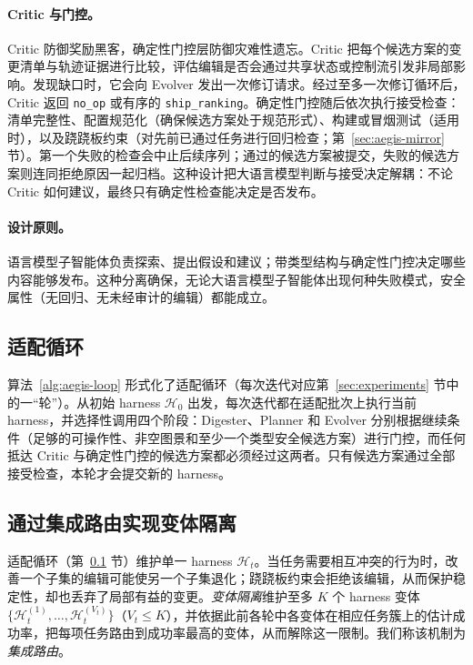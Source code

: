 \paragraph{Critic 与门控。}
Critic 防御奖励黑客，确定性门控层防御灾难性遗忘。Critic 把每个候选方案的变更清单与轨迹证据进行比较，评估编辑是否会通过共享状态或控制流引发非局部影响。发现缺口时，它会向 Evolver 发出一次修订请求。经过至多一次修订循环后，Critic 返回 \texttt{no\_op} 或有序的 \texttt{ship\_ranking}。确定性门控随后依次执行接受检查：清单完整性、配置规范化（确保候选方案处于规范形式）、构建或冒烟测试（适用时），以及跷跷板约束（对先前已通过任务进行回归检查；第~\ref{sec:aegis-mirror} 节）。第一个失败的检查会中止后续序列；通过的候选方案被提交，失败的候选方案则连同拒绝原因一起归档。这种设计把大语言模型判断与接受决定解耦：不论 Critic 如何建议，最终只有确定性检查能决定是否发布。

\paragraph{设计原则。}
语言模型子智能体负责探索、提出假设和建议；带类型结构与确定性门控决定哪些内容能够发布。这种分离确保，无论大语言模型子智能体出现何种失败模式，安全属性（无回归、无未经审计的编辑）都能成立。

\subsection{适配循环}
\label{sec:aegis-loop}

算法~\ref{alg:aegis-loop} 形式化了适配循环（每次迭代对应第~\ref{sec:experiments} 节中的一“轮”）。从初始 harness $\mathcal{H}_0$ 出发，每次迭代都在适配批次上执行当前 harness，并选择性调用四个阶段：Digester、Planner 和 Evolver 分别根据继续条件（足够的可操作性、非空图景和至少一个类型安全候选方案）进行门控，而任何抵达 Critic 与确定性门控的候选方案都必须经过这两者。只有候选方案通过全部接受检查，本轮才会提交新的 harness。

\subsection{通过集成路由实现变体隔离}
\label{sec:aegis-ensemble}

适配循环（第~\ref{sec:aegis-loop} 节）维护单一 harness $\mathcal{H}_t$。当任务需要相互冲突的行为时，改善一个子集的编辑可能使另一个子集退化；跷跷板约束会拒绝该编辑，从而保护稳定性，却也丢弃了局部有益的变更。\textit{变体隔离}维护至多 $K$ 个 harness 变体 $\{\mathcal{H}_t^{(1)},\ldots,\mathcal{H}_t^{(V_t)}\}$（$V_t\leq K$），并依据此前各轮中各变体在相应任务簇上的估计成功率，把每项任务路由到成功率最高的变体，从而解除这一限制。我们称该机制为\textit{集成路由}。

